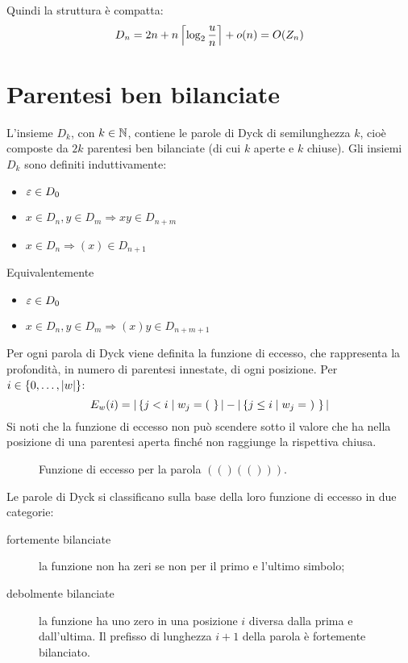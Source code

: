 Quindi la struttura è compatta:
\begin{equation*}
	D_n = 2n+n\left\lceil \log_2\frac un \right\rceil+o(n) = O(Z_n)
\end{equation*}



\section{Parentesi ben bilanciate}
L'insieme $D_k$, con $k\in\mathbb N$, contiene le parole di Dyck di semilunghezza $k$, cioè composte da $2k$ parentesi ben bilanciate (di cui $k$ aperte e $k$ chiuse). Gli insiemi $D_k$ sono definiti induttivamente:
\begin{itemize}
	\item $\varepsilon\in D_0$
	\item $x\in D_n,y\in D_m\Rightarrow xy\in D_{n+m}$
	\item $x\in D_n\Rightarrow (x)\in D_{n+1}$
\end{itemize}
Equivalentemente
\begin{itemize}
	\item $\varepsilon\in D_0$
	\item $x\in D_n,y\in D_m\Rightarrow (x)y\in D_{n+m+1}$
\end{itemize}

Per ogni parola di Dyck viene definita la funzione di eccesso, che rappresenta la profondità, in numero di parentesi innestate, di ogni posizione. Per $i\in\left\{ 0,\dots,|w| \right\}$:
\begin{equation*}
	E_w(i) = | \left\{ j < i \mid w_j = (~  \right\} | - | \left\{ j\leq i \mid w_j =~)~  \right\} |
\end{equation*}
Si noti che la funzione di eccesso non può scendere sotto il valore che ha nella posizione di una parentesi aperta finché non raggiunge la rispettiva chiusa.

\begin{figure}[ht]
	\centering
	
	\caption{Funzione di eccesso per la parola $(()(()))$.}
	\label{fig:func_excess}
\end{figure}

Le parole di Dyck si classificano sulla base della loro funzione di eccesso in due categorie:
\begin{description}
	\item[fortemente bilanciate] la funzione non ha zeri se non per il primo e l'ultimo simbolo;
	\item[debolmente bilanciate] la funzione ha uno zero in una posizione $i$ diversa dalla prima e dall'ultima. Il prefisso di lunghezza $i+1$ della parola è fortemente bilanciato.
\end{description}

